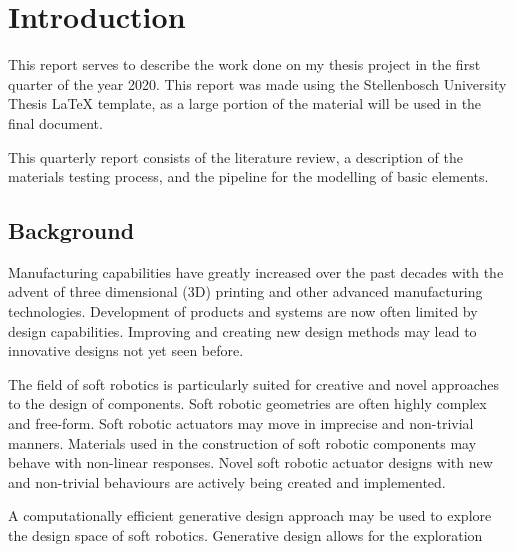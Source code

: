 \chapter{Introduction}
\label{chp:Intro}

This report serves to describe the work done on my thesis project in the first quarter of the year 2020. This report was made using the Stellenbosch University Thesis LaTeX template, as a large portion of the material will be used in the final document.

This quarterly report consists of the literature review, a description of the materials testing process, and the pipeline for the modelling of basic elements.

\section{Background}

Manufacturing capabilities have greatly increased over the past decades with the advent of three dimensional (3D) printing and other advanced manufacturing technologies. Development of products and systems are now often limited by design capabilities. Improving and creating new design methods may lead to innovative designs not yet seen before.

The field of soft robotics is particularly suited for creative and novel approaches to the design of components. Soft robotic geometries are often highly complex and free-form. Soft robotic actuators may move in imprecise and non-trivial manners. Materials used in the construction of soft robotic components may behave with non-linear responses. Novel soft robotic actuator designs with new and non-trivial behaviours are actively being created and implemented.

A computationally efficient generative design approach may be used to explore the design space of soft robotics. Generative design allows for the exploration 
